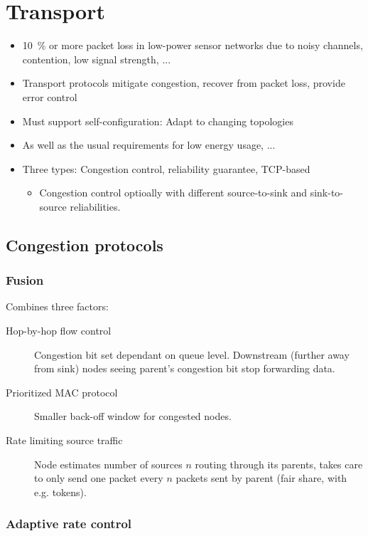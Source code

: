 \section{Transport}

\begin{itemize}
		\item \SI{10}{\percent} or more packet loss in low-power sensor
				networks due to noisy channels, contention, low signal
				strength, ...
		\item Transport protocols mitigate congestion, recover from packet
				loss, provide error control
		\item Must support self-configuration: Adapt to changing topologies
		\item As well as the usual requirements for low energy usage, ...
		\item Three types: Congestion control, reliability guarantee, TCP-based
				\begin{itemize}
						\item Congestion control optioally with different
								source-to-sink and sink-to-source
								reliabilities.
				\end{itemize}
\end{itemize}

\subsection{Congestion protocols}

\subsubsection{Fusion}

Combines three factors:
\begin{description}
		\item[Hop-by-hop flow control] Congestion bit set dependant on queue
				level. Downstream (further away from sink) nodes seeing
				parent's congestion bit stop forwarding data.
		\item[Prioritized MAC protocol] Smaller back-off window for congested nodes.
		\item[Rate limiting source traffic] Node estimates number of sources
				$n$ routing through its parents, takes care to only send one
				packet every $n$ packets sent by parent (fair share, with e.g.
				tokens).
\end{description}

\subsubsection{Adaptive rate control}

